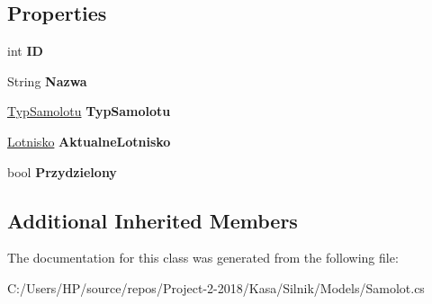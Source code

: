 \subsection*{Properties}
\begin{DoxyCompactItemize}
\item 
\mbox{\label{class_silnik_1_1_samolot_af9a4063dbb722f2db2009fd68cfd47c7}} 
int {\bfseries ID}
\item 
\mbox{\label{class_silnik_1_1_samolot_aa1a2e910c38fe0c315f4f4dd5aba6da7}} 
String {\bfseries Nazwa}
\item 
\mbox{\label{class_silnik_1_1_samolot_a9eefea716beb59ccd0c824a7bd778d91}} 
\mbox{\hyperlink{class_silnik_1_1_models_1_1_typ_samolotu}{Typ\+Samolotu}} {\bfseries Typ\+Samolotu}
\item 
\mbox{\label{class_silnik_1_1_samolot_ac17b1d553d5f941bcdb141b4532cfef7}} 
\mbox{\hyperlink{class_silnik_1_1_lotnisko}{Lotnisko}} {\bfseries Aktualne\+Lotnisko}
\item 
\mbox{\label{class_silnik_1_1_samolot_a0c75f071aa0cb7a9439144120fd3d4d1}} 
bool {\bfseries Przydzielony}
\end{DoxyCompactItemize}
\subsection*{Additional Inherited Members}


The documentation for this class was generated from the following file\+:\begin{DoxyCompactItemize}
\item 
C\+:/\+Users/\+H\+P/source/repos/\+Project-\/2-\/2018/\+Kasa/\+Silnik/\+Models/Samolot.\+cs\end{DoxyCompactItemize}
